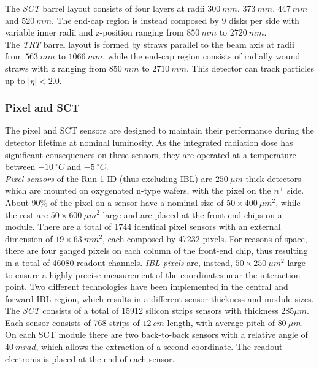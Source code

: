 \documentclass[a4paper,twoside,12pt]{article}
\begin{document}
The \textit{SCT} barrel layout consists of four layers at radii $300\ mm$, $373\ mm$, $447\ mm$ and $520\ mm$. The end-cap region is instead composed by 9 disks per side with variable
inner radii and z-position ranging from $850\ mm$ to $2720\ mm$. \\

The \textit{TRT} barrel layout is formed by straws parallel to the beam axis at radii from $563\ mm$ to $1066\ mm$,
while the end-cap region consists of radially wound straws with z ranging from $850\ mm$ to 
$2710\ mm$. This detector can track particles up to $|\eta| < 2.0$.

\subsubsection*{Pixel and SCT}

The pixel and SCT sensors are designed to maintain their performance during the detector
lifetime at nominal luminosity\cite{Aad:2008zzm}. As the integrated radiation dose has significant consequences
on these sensors, they are operated at a temperature between $-10\ ^{\circ}C$ and $-5\ ^{\circ}C$.\\

\textit{Pixel sensors} of the Run 1 ID (thus excluding IBL) are $250\ \mu m$ thick detectors which are mounted on oxygenated n-type wafers, with the pixel on the $n^+$ side. About 90\% of the pixel on a sensor have a nominal 
size of $50 \times 400\ \mu m^2$, while the rest are $50 \times 600\ \mu m^2$ large and are placed
at the front-end chips on a module. There are a total of 1744 identical pixel sensors with an external dimension of $19 \times 63\ mm^2$, each composed by 47232 pixels. For reasons of space, there are four ganged pixels on each column of the front-end chip, thus resulting in a total of 46080 readout channels. \textit{IBL pixels} are, instead, $50 \times 250\ \mu m^2$ large to 
ensure a highly precise measurement of the coordinates near the interaction point\cite{IBL}. Two 
different technologies have been implemented in the central and forward IBL region, which
results in a different sensor thickness and module sizes.\\

The \textit{SCT} consists of a total of 15912 silicon strips sensors with thickness $285 \mu m$. Each sensor consists of 768 strips of $12\ cm$ length, with average pitch of $80\ \mu m$.
On each SCT module there are two back-to-back sensors with a relative angle of $40\ mrad$,
which allows the extraction of a second coordinate. The readout electronis is placed at the end of each sensor.\\
\end{document}
